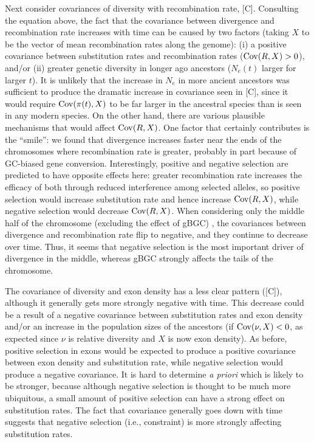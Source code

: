 Next consider covariances of diversity with recombination rate, [C].
Consulting the equation above,
the fact that the covariance between divergence and recombination rate increases with time
can be caused by two factors (taking $X$ to be the vector of mean recombination rates along the genome):
(i) a positive covariance between substitution rates and recombination rates ($\operatorname{Cov}(R,X)>0$), and/or
(ii) greater genetic diversity in longer ago ancestors ($N_e(t)$ larger for larger $t$).
It is unlikely that the increase in $N_e$ in more ancient ancestors
was sufficient to produce the dramatic increase in covariance seen in [C],
since it would require $\operatorname{Cov}(\pi(t), X)$ to be far larger in the ancestral species
than is seen in any modern species.
On the other hand, there are various plausible mechanisms that would affect $\operatorname{Cov}(R, X)$.
One factor that certainly contributes is the ``smile'':
we found that divergence increases faster near the ends of the chromosomes
where recombination rate is greater,
probably in part because of GC-biased gene conversion.
Interestingly, positive and negative selection are predicted to have opposite effects here:
greater recombination rate increases the efficacy of both through reduced interference among selected alleles,
so positive selection would increase substitution rate and hence increase $\operatorname{Cov}(R, X)$,
while negative selection would decrease $\operatorname{Cov}(R, X)$.
When considering only the middle half of the chromosome (\ie excluding the effect of gBGC) ,
the covariances between divergence and recombination rate flip to negative, and they continue to decrease over time.
Thus, it seems that negative selection is the most important driver of divergence in the middle, whereas
gBGC strongly affects the tails of the chromosome.

The covariance of diversity and exon density has a less clear pattern ([C]),
although it generally gets more strongly negative with time.
This decrease could be a result of
a negative covariance between substitution rates and exon density
and/or an increase in the population sizes of the ancestors
(if $\operatorname{Cov}(\nu, X) < 0$, as expected since $\nu$ is relative diversity and $X$ is now exon density).
As before, positive selection in exons would be expected to produce a positive covariance
between exon density and substitution rate,
while negative selection would produce a negative covariance.
It is hard to determine \emph{a priori} which is likely to be stronger,
because although negative selection is thought to be much more ubiquitous,
a small amount of positive selection can have a strong effect on substitution rates.
The fact that covariance generally goes down with time
suggests that negative selection (i.e., constraint)
is more strongly affecting substitution rates.

